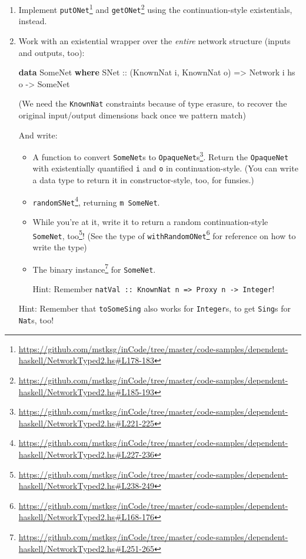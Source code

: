 \documentclass[]{article}
\newenvironment{Shaded}{}{}
\newcommand{\KeywordTok}[1]{\textcolor[rgb]{0.00,0.44,0.13}{\textbf{{#1}}}}
\newcommand{\DataTypeTok}[1]{\textcolor[rgb]{0.56,0.13,0.00}{{#1}}}
\newcommand{\OtherTok}[1]{\textcolor[rgb]{0.00,0.44,0.13}{{#1}}}
\newcommand{\NormalTok}[1]{{#1}}
\renewcommand{\href}[2]{#2\footnote{\url{#1}}}
\begin{document}
\begin{enumerate}
\def\labelenumi{\arabic{enumi}.}
\item
  Implement
  \href{https://github.com/mstksg/inCode/tree/master/code-samples/dependent-haskell/NetworkTyped2.hs\#L178-183}{\texttt{putONet\textquotesingle{}}}
  and
  \href{https://github.com/mstksg/inCode/tree/master/code-samples/dependent-haskell/NetworkTyped2.hs\#L185-193}{\texttt{getONet\textquotesingle{}}}
  using the continuation-style existentials, instead.
\item
  Work with an existential wrapper over the \emph{entire} network structure
  (inputs and outputs, too):

\begin{Shaded}
\begin{Highlighting}[]
\KeywordTok{data} \DataTypeTok{SomeNet} \KeywordTok{where}
    \DataTypeTok{SNet}\OtherTok{ ::} \NormalTok{(}\DataTypeTok{KnownNat} \NormalTok{i, }\DataTypeTok{KnownNat} \NormalTok{o)}
         \OtherTok{=>} \DataTypeTok{Network} \NormalTok{i hs o}
         \OtherTok{->} \DataTypeTok{SomeNet}
\end{Highlighting}
\end{Shaded}

  (We need the \texttt{KnownNat} constraints because of type erasure, to recover
  the original input/output dimensions back once we pattern match)

  And write:

  \begin{itemize}
  \item
    A function to
    \href{https://github.com/mstksg/inCode/tree/master/code-samples/dependent-haskell/NetworkTyped2.hs\#L221-225}{convert
    \texttt{SomeNet}s to \texttt{OpaqueNet}s}. Return the \texttt{OpaqueNet}
    with existentially quantified \texttt{i} and \texttt{o} in
    continuation-style. (You can write a data type to return it in
    constructor-style, too, for funsies.)
  \item
    \href{https://github.com/mstksg/inCode/tree/master/code-samples/dependent-haskell/NetworkTyped2.hs\#L227-236}{\texttt{randomSNet}},
    returning \texttt{m\ SomeNet}.
  \item
    While you're at it, write it to return
    \href{https://github.com/mstksg/inCode/tree/master/code-samples/dependent-haskell/NetworkTyped2.hs\#L238-249}{a
    random continuation-style \texttt{SomeNet}, too}! (See the type of
    \href{https://github.com/mstksg/inCode/tree/master/code-samples/dependent-haskell/NetworkTyped2.hs\#L168-176}{\texttt{withRandomONet\textquotesingle{}}}
    for reference on how to write the type)
  \item
    The
    \href{https://github.com/mstksg/inCode/tree/master/code-samples/dependent-haskell/NetworkTyped2.hs\#L251-265}{binary
    instance} for \texttt{SomeNet}.

    Hint: Remember
    \texttt{natVal\ ::\ KnownNat\ n\ =\textgreater{}\ Proxy\ n\ -\textgreater{}\ Integer}!
  \end{itemize}

  Hint: Remember that \texttt{toSomeSing} also works for \texttt{Integer}s, to
  get \texttt{Sing}s for \texttt{Nat}s, too!
\end{enumerate}
\end{document}

